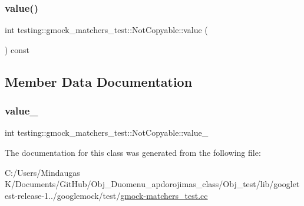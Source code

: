 \subsubsection{\texorpdfstring{value()}{value()}}
{\footnotesize\ttfamily int testing\+::gmock\+\_\+matchers\+\_\+test\+::\+Not\+Copyable\+::value (\begin{DoxyParamCaption}{ }\end{DoxyParamCaption}) const\hspace{0.3cm}{\ttfamily [inline]}}



\subsection{Member Data Documentation}
\mbox{\label{classtesting_1_1gmock__matchers__test_1_1_not_copyable_ad39e5f41c6359a24bca90fb734dd0f89}} 
\subsubsection{\texorpdfstring{value\_}{value\_}}
{\footnotesize\ttfamily int testing\+::gmock\+\_\+matchers\+\_\+test\+::\+Not\+Copyable\+::value\+\_\+\hspace{0.3cm}{\ttfamily [private]}}



The documentation for this class was generated from the following file\+:\begin{DoxyCompactItemize}
\item 
C\+:/\+Users/\+Mindaugas K/\+Documents/\+Git\+Hub/\+Obj\+\_\+\+Duomenu\+\_\+apdorojimas\+\_\+class/\+Obj\+\_\+test/lib/googletest-\/release-\/1../googlemock/test/\mbox{\hyperlink{_obj__test_2lib_2googletest-release-1_88_81_2googlemock_2test_2gmock-matchers__test_8cc}{gmock-\/matchers\+\_\+test.\+cc}}\end{DoxyCompactItemize}
